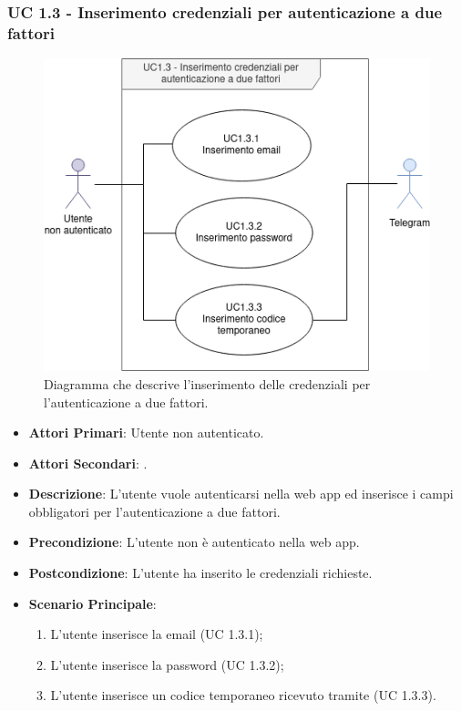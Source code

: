 		\subsubsection{UC 1.3 - Inserimento credenziali per autenticazione a due fattori}

		\begin{figure}[H]
			\centering
			\includegraphics[scale=0.675]{res/images/uc1.3}
			\caption{Diagramma che descrive l'inserimento delle credenziali per l'autenticazione a due fattori.}
		\end{figure}

		\begin{itemize}
			\item \textbf{Attori Primari}: Utente non autenticato.
			\item \textbf{Attori Secondari}: .
			\item \textbf{Descrizione}: L'utente vuole autenticarsi nella web app ed inserisce i campi obbligatori per l'autenticazione a due fattori.
			\item \textbf{Precondizione}: L'utente non è autenticato nella web app.
			\item \textbf{Postcondizione}: L'utente ha inserito le credenziali richieste.
			\item \textbf{Scenario Principale}:
			\begin{enumerate}
				\item L'utente inserisce la email (UC 1.3.1);
				\item L'utente inserisce la password (UC 1.3.2);
				\item L'utente inserisce un codice temporaneo ricevuto tramite  (UC 1.3.3).
			\end{enumerate}	
		\end{itemize}

